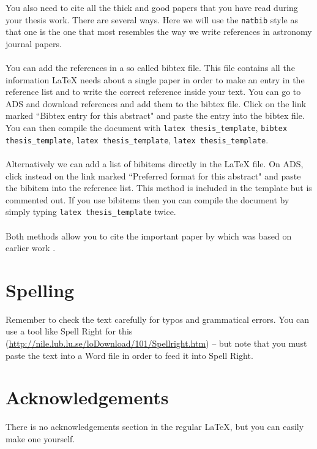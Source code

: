 \documentclass[12pt]{report}
\newcommand{\mnras}{MNRAS}
\newcommand{\aap}{A\&A}
\begin{document}
You also need to cite all the thick and good papers that you have read during
your thesis work. There are several ways. Here we will use the {\tt natbib}
style as that one is the one that most resembles the way we write references in
astronomy journal papers. 
\\ \\
You can add the references in a so called bibtex file. This file contains all
the information LaTeX needs about a single paper in order to make an entry in
the reference list and to write the correct reference inside your text. You can
go to ADS and download references and add them to the bibtex file. Click
on the link marked ``Bibtex entry for this abstract" and paste the entry into
the bibtex file. You can then compile the document with {\tt latex
thesis\_template}, {\tt bibtex thesis\_template}, {\tt latex thesis\_template},
{\tt latex thesis\_template}.
\\ \\
Alternatively we can add a list of bibitems directly in the LaTeX file. On ADS,
click instead on the link marked ``Preferred format for this abstract" and
paste the bibitem into the reference list. This method is included in the
template but is commented out. If you use bibitems then you can compile the
document by simply typing {\tt latex thesis\_template} twice.
\\ \\
Both methods allow you to cite the important paper by
\cite{2007MNRAS.375..500A} which was based on earlier work
\citep{2001A&A...373.1019S}.

\section{Spelling}

Remember to check the text carefully for typos and grammatical errors. You can
use a tool like Spell Right for this
(\url{http://nile.lub.lu.se/loDownload/101/Spellright.htm}) -- but note that
you must paste the text into a Word file in order to feed it into Spell Right.

\section*{Acknowledgements}

There is no acknowledgements section in the regular LaTeX, but you can easily
make one yourself.

%
\end{document}
